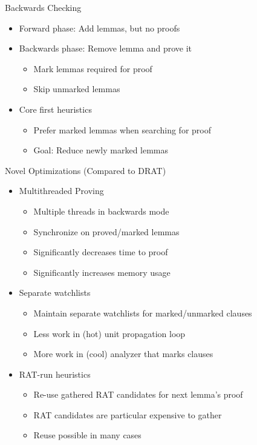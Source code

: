 \documentclass[fleqn]{beamer}
\begin{document}
\begin{frame}{Backwards Checking}
  \begin{itemize}
   \item Forward phase: Add lemmas, but no proofs
   \item Backwards phase: Remove lemma and prove it
    \begin{itemize}
     \item Mark lemmas required for proof
     \item Skip unmarked lemmas
    \end{itemize}
   \item Core first heuristics
    \begin{itemize}
     \item Prefer marked lemmas when searching for proof
     \item Goal: Reduce newly marked lemmas
  
    \end{itemize}
  \end{itemize}
\end{frame}
\begin{frame}{Novel Optimizations (Compared to DRAT)}
  \begin{itemize}
   \item Multithreaded Proving
    \begin{itemize}
     \item Multiple threads in backwards mode
     \item Synchronize on proved/marked lemmas
     \item Significantly decreases time to proof
     \item Significantly increases memory usage
    \end{itemize}
   \item Separate watchlists
    \begin{itemize}
     \item Maintain separate watchlists for marked/unmarked clauses
     \item Less work in (hot) unit propagation loop
     \item More work in (cool) analyzer that marks clauses
    \end{itemize}
   \item RAT-run heuristics
    \begin{itemize}
     \item Re-use gathered RAT candidates for next lemma's proof
     \item RAT candidates are particular expensive to gather
     \item Reuse possible in many cases

    \end{itemize}
  \end{itemize}
\end{frame}
\end{document}
